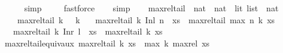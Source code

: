 \begin{isabellebody}
\ \ \ \ \isamarkupfalse%
\ simp\isanewline
\ \ \ \isamarkupfalse%
\ fastforce\isanewline
\ \ \isamarkupfalse%
\ simp\isanewline
\ \ \isamarkupfalse%
%
\endisatagproof
{\isafoldproof}%
%
\isadelimproof
\isanewline
%
\endisadelimproof
\isanewline
{}\isamarkupfalse%
\ max{\isacharunderscore}{\kern0pt}rel{\isacharunderscore}{\kern0pt}tail\ {\isacharcolon}{\kern0pt}{\isacharcolon}{\kern0pt}\ {\isachardoublequoteopen}nat\ {\isasymRightarrow}\ {\isacharparenleft}{\kern0pt}nat\ {\isacharplus}{\kern0pt}\ lit{\isacharparenright}{\kern0pt}\ list\ {\isasymRightarrow}\ nat{\isachardoublequoteclose}\isanewline
\ \ \ \isanewline
\ \ \ \ {\isachardoublequoteopen}max{\isacharunderscore}{\kern0pt}rel{\isacharunderscore}{\kern0pt}tail\ k\ {\isacharbrackleft}{\kern0pt}{\isacharbrackright}{\kern0pt}\ {\isacharequal}{\kern0pt}\ k{\isachardoublequoteclose}\isanewline
\ \ {\isacharbar}{\kern0pt}\ {\isachardoublequoteopen}max{\isacharunderscore}{\kern0pt}rel{\isacharunderscore}{\kern0pt}tail\ k\ {\isacharparenleft}{\kern0pt}{\isacharparenleft}{\kern0pt}Inl\ n{\isacharparenright}{\kern0pt}\ {\isacharhash}{\kern0pt}\ xs{\isacharparenright}{\kern0pt}\ {\isacharequal}{\kern0pt}\ {\isacharparenleft}{\kern0pt}max{\isacharunderscore}{\kern0pt}rel{\isacharunderscore}{\kern0pt}tail\ {\isacharparenleft}{\kern0pt}max\ n\ k{\isacharparenright}{\kern0pt}\ xs{\isacharparenright}{\kern0pt}{\isachardoublequoteclose}\ \isanewline
\ \ {\isacharbar}{\kern0pt}\ {\isachardoublequoteopen}max{\isacharunderscore}{\kern0pt}rel{\isacharunderscore}{\kern0pt}tail\ k\ {\isacharparenleft}{\kern0pt}{\isacharparenleft}{\kern0pt}Inr\ l{\isacharparenright}{\kern0pt}\ {\isacharhash}{\kern0pt}\ xs{\isacharparenright}{\kern0pt}\ {\isacharequal}{\kern0pt}\ {\isacharparenleft}{\kern0pt}max{\isacharunderscore}{\kern0pt}rel{\isacharunderscore}{\kern0pt}tail\ k\ xs{\isacharparenright}{\kern0pt}{\isachardoublequoteclose}\isanewline
\isanewline
{}\isamarkupfalse%
\ max{\isacharunderscore}{\kern0pt}rel{\isacharunderscore}{\kern0pt}tail{\isacharunderscore}{\kern0pt}equiv{\isacharunderscore}{\kern0pt}aux{\isacharcolon}{\kern0pt}\ {\isachardoublequoteopen}max{\isacharunderscore}{\kern0pt}rel{\isacharunderscore}{\kern0pt}tail\ k\ xs\ {\isacharequal}{\kern0pt}\ max\ k\ {\isacharparenleft}{\kern0pt}max{\isacharunderscore}{\kern0pt}rel\ xs{\isacharparenright}{\kern0pt}{\isachardoublequoteclose}\isanewline
%
\isadelimproof
\ \ %
\endisadelimproof
%
\isatagproof
{}\isamarkupfalse%

\end{isabellebody}
